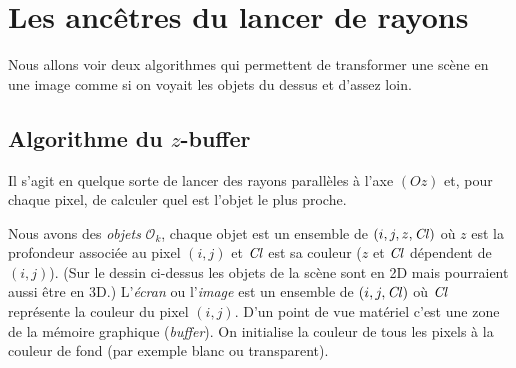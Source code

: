 \documentclass[11pt,class=report,crop=false]{standalone}
\begin{document}
\newcommand{\Cl}{\operatorname{\it Cl}}















\section{Les ancêtres du lancer de rayons}

Nous allons voir deux algorithmes qui permettent de transformer une scène en une image comme si on voyait les objets du dessus et d'assez loin.

\subsection{Algorithme du $z$-buffer}


Il s'agit en quelque sorte de lancer des rayons parallèles à l'axe $(Oz)$ et, pour chaque pixel, de calculer quel est l'objet le plus proche.


Nous avons des \emph{objets} $\mathcal{O}_k$, chaque objet est un ensemble de $(i,j,z,\Cl)$ où $z$ est la profondeur associée au pixel $(i,j)$ et $\Cl$ est sa couleur ($z$ et $\Cl$ dépendent de $(i,j)$).
(Sur le dessin ci-dessus les objets de la scène sont en 2D mais pourraient aussi être en 3D.)
L'\emph{écran} ou l'\emph{image} est un ensemble de $(i,j,\Cl)$ où $\Cl$ représente la couleur du pixel $(i,j)$. D'un point de vue matériel c'est une zone de la mémoire graphique (\emph{buffer}). On initialise la couleur de tous les pixels à la couleur de fond (par exemple blanc ou transparent).
\end{document}
